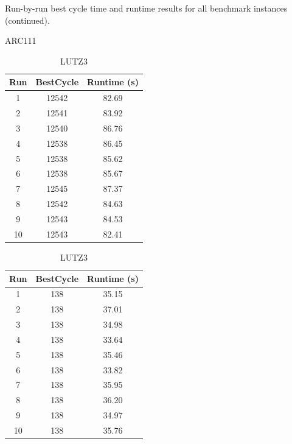 \documentclass[12pt,a4paper]{article}
\begin{document}
\begin{table}[t]
\ContinuedFloat
\centering
\caption{Run-by-run best cycle time and runtime results for all benchmark instances (continued).}
\footnotesize

\begin{subtable}{0.48\textwidth}
\centering
\caption{ARC111}
\begin{tabular}{ccc}
\toprule
Run & BestCycle & Runtime (s) \\
\midrule
1  & 12542 & 82.69 \\
2  & 12541 & 83.92 \\
3  & 12540 & 86.76 \\
4  & 12538 & 86.45 \\
5  & 12538 & 85.62 \\
6  & 12538 & 85.67 \\
7  & 12545 & 87.37 \\
8  & 12542 & 84.63 \\
9  & 12543 & 84.53 \\
10 & 12543 & 82.41 \\
\bottomrule
\end{tabular}
\end{subtable}
\hfill
\begin{subtable}{0.48\textwidth}
\centering
\caption{LUTZ3}
\begin{tabular}{ccc}
\toprule
Run & BestCycle & Runtime (s) \\
\midrule
1  & 138 & 35.15 \\
2  & 138 & 37.01 \\
3  & 138 & 34.98 \\
4  & 138 & 33.64 \\
5  & 138 & 35.46 \\
6  & 138 & 33.82 \\
7  & 138 & 35.95 \\
8  & 138 & 36.20 \\
9  & 138 & 34.97 \\
10 & 138 & 35.76 \\
\bottomrule
\end{tabular}
\end{subtable}

\vspace{4mm}


\end{table}
\end{document}
